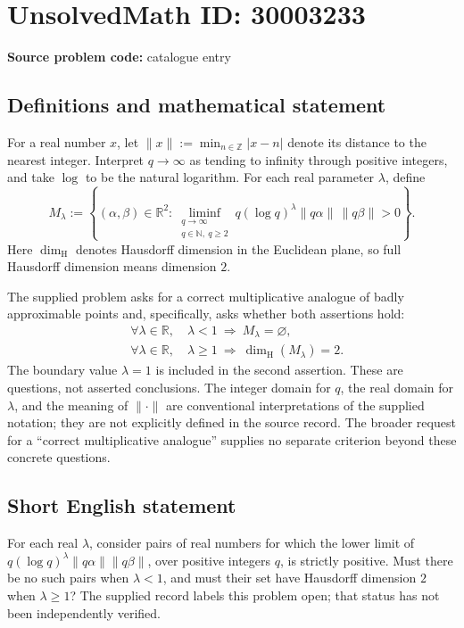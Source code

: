 \documentclass[11pt]{article}
\newcommand{\N}{\mathbb{N}}
\newcommand{\Z}{\mathbb{Z}}
\newcommand{\R}{\mathbb{R}}
\begin{document}
\section*{UnsolvedMath ID: 30003233}
\textbf{Source problem code:} catalogue entry
\subsection{Definitions and mathematical statement}
For a real number \(x\), let \(\|x\|:=\min_{n\in\Z}|x-n|\) denote its distance to the nearest integer. Interpret \(q\to\infty\) as tending to infinity through positive integers, and take \(\log\) to be the natural logarithm. For each real parameter \(\lambda\), define
\[
M_\lambda:=\left\{(\alpha,\beta)\in\R^2:\liminf_{\substack{q\to\infty\\q\in\N,\ q\ge2}}q(\log q)^\lambda\|q\alpha\|\,\|q\beta\|>0\right\}.
\]
Here \(\dim_{\mathrm H}\) denotes Hausdorff dimension in the Euclidean plane, so full Hausdorff dimension means dimension \(2\).

The supplied problem asks for a correct multiplicative analogue of badly approximable points and, specifically, asks whether both assertions hold:
\[
\begin{aligned}
&\forall\lambda\in\R,\quad \lambda<1\ \Longrightarrow\ M_\lambda=\varnothing,\\
&\forall\lambda\in\R,\quad \lambda\ge1\ \Longrightarrow\ \dim_{\mathrm H}(M_\lambda)=2.
\end{aligned}
\]
The boundary value \(\lambda=1\) is included in the second assertion. These are questions, not asserted conclusions. The integer domain for \(q\), the real domain for \(\lambda\), and the meaning of \(\|\cdot\|\) are conventional interpretations of the supplied notation; they are not explicitly defined in the source record. The broader request for a ``correct multiplicative analogue'' supplies no separate criterion beyond these concrete questions.
\subsection{Short English statement}
For each real \(\lambda\), consider pairs of real numbers for which the lower limit of \(q(\log q)^\lambda\|q\alpha\|\|q\beta\|\), over positive integers \(q\), is strictly positive. Must there be no such pairs when \(\lambda<1\), and must their set have Hausdorff dimension \(2\) when \(\lambda\ge1\)? The supplied record labels this problem open; that status has not been independently verified.
\end{document}
